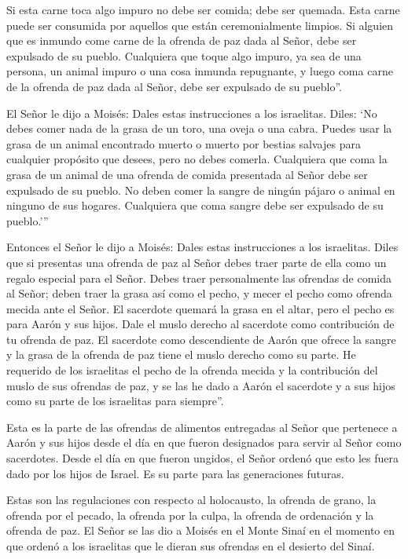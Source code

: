  Si esta carne toca algo impuro no debe ser comida; debe
ser quemada. Esta carne puede ser consumida por aquellos que están
ceremonialmente limpios.  Si alguien que es inmundo come
carne de la ofrenda de paz dada al Señor, debe ser expulsado de su
pueblo.  Cualquiera que toque algo impuro, ya sea de una
persona, un animal impuro o una cosa inmunda repugnante, y luego coma
carne de la ofrenda de paz dada al Señor, debe ser expulsado de su
pueblo''.

 El Señor le dijo a Moisés:  Dales estas
instrucciones a los israelitas. Diles: `No debes comer nada de la grasa
de un toro, una oveja o una cabra.  Puedes usar la grasa de
un animal encontrado muerto o muerto por bestias salvajes para cualquier
propósito que desees, pero no debes comerla.  Cualquiera
que coma la grasa de un animal de una ofrenda de comida presentada al
Señor debe ser expulsado de su pueblo.  No deben comer la
sangre de ningún pájaro o animal en ninguno de sus hogares.
 Cualquiera que coma sangre debe ser expulsado de su
pueblo.'''

 Entonces el Señor le dijo a Moisés:  Dales
estas instrucciones a los israelitas. Diles que si presentas una ofrenda
de paz al Señor debes traer parte de ella como un regalo especial para
el Señor.  Debes traer personalmente las ofrendas de comida
al Señor; deben traer la grasa así como el pecho, y mecer el pecho como
ofrenda mecida ante el Señor.  El sacerdote quemará la
grasa en el altar, pero el pecho es para Aarón y sus hijos.
 Dale el muslo derecho al sacerdote como contribución de tu
ofrenda de paz.  El sacerdote como descendiente de Aarón
que ofrece la sangre y la grasa de la ofrenda de paz tiene el muslo
derecho como su parte.  He requerido de los israelitas el
pecho de la ofrenda mecida y la contribución del muslo de sus ofrendas
de paz, y se las he dado a Aarón el sacerdote y a sus hijos como su
parte de los israelitas para siempre''.

 Esta es la parte de las ofrendas de alimentos entregadas
al Señor que pertenece a Aarón y sus hijos desde el día en que fueron
designados para servir al Señor como sacerdotes.  Desde el
día en que fueron ungidos, el Señor ordenó que esto les fuera dado por
los hijos de Israel. Es su parte para las generaciones futuras.

 Estas son las regulaciones con respecto al holocausto, la
ofrenda de grano, la ofrenda por el pecado, la ofrenda por la culpa, la
ofrenda de ordenación y la ofrenda de paz.  El Señor se las
dio a Moisés en el Monte Sinaí en el momento en que ordenó a los
israelitas que le dieran sus ofrendas en el desierto del Sinaí.


